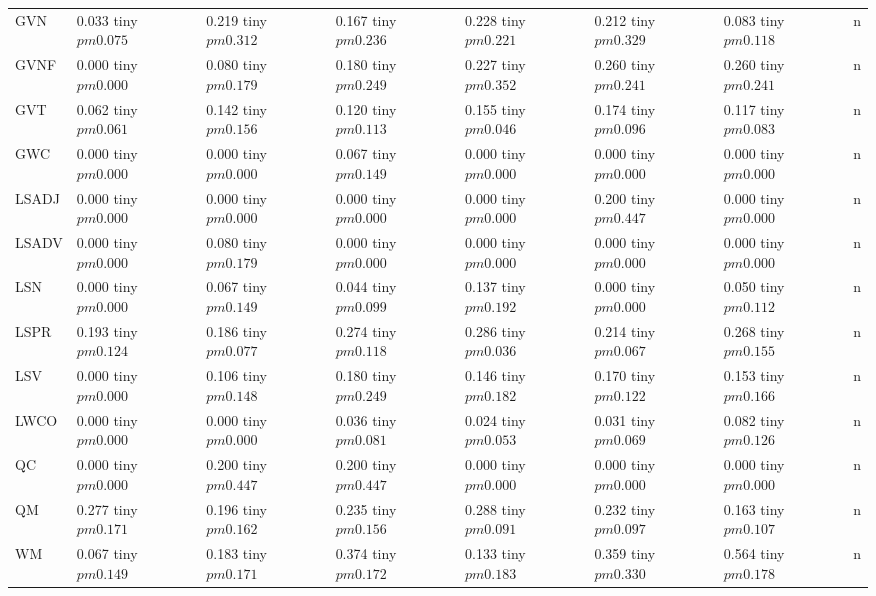 \begin{table}
\begin{tabular}{llllllll}
GVN & 0.033 tiny $ pm 0.075$ & 0.219 tiny $ pm 0.312$ & 0.167 tiny $ pm 0.236$ & 0.228 tiny $ pm 0.221$ & 0.212 tiny $ pm 0.329$ & 0.083 tiny $ pm 0.118$ & n \\
GVNF & 0.000 tiny $ pm 0.000$ & 0.080 tiny $ pm 0.179$ & 0.180 tiny $ pm 0.249$ & 0.227 tiny $ pm 0.352$ & 0.260 tiny $ pm 0.241$ & 0.260 tiny $ pm 0.241$ & n \\
GVT & 0.062 tiny $ pm 0.061$ & 0.142 tiny $ pm 0.156$ & 0.120 tiny $ pm 0.113$ & 0.155 tiny $ pm 0.046$ & 0.174 tiny $ pm 0.096$ & 0.117 tiny $ pm 0.083$ & n \\
GWC & 0.000 tiny $ pm 0.000$ & 0.000 tiny $ pm 0.000$ & 0.067 tiny $ pm 0.149$ & 0.000 tiny $ pm 0.000$ & 0.000 tiny $ pm 0.000$ & 0.000 tiny $ pm 0.000$ & n \\
LSADJ & 0.000 tiny $ pm 0.000$ & 0.000 tiny $ pm 0.000$ & 0.000 tiny $ pm 0.000$ & 0.000 tiny $ pm 0.000$ & 0.200 tiny $ pm 0.447$ & 0.000 tiny $ pm 0.000$ & n \\
LSADV & 0.000 tiny $ pm 0.000$ & 0.080 tiny $ pm 0.179$ & 0.000 tiny $ pm 0.000$ & 0.000 tiny $ pm 0.000$ & 0.000 tiny $ pm 0.000$ & 0.000 tiny $ pm 0.000$ & n \\
LSN & 0.000 tiny $ pm 0.000$ & 0.067 tiny $ pm 0.149$ & 0.044 tiny $ pm 0.099$ & 0.137 tiny $ pm 0.192$ & 0.000 tiny $ pm 0.000$ & 0.050 tiny $ pm 0.112$ & n \\
LSPR & 0.193 tiny $ pm 0.124$ & 0.186 tiny $ pm 0.077$ & 0.274 tiny $ pm 0.118$ & 0.286 tiny $ pm 0.036$ & 0.214 tiny $ pm 0.067$ & 0.268 tiny $ pm 0.155$ & n \\
LSV & 0.000 tiny $ pm 0.000$ & 0.106 tiny $ pm 0.148$ & 0.180 tiny $ pm 0.249$ & 0.146 tiny $ pm 0.182$ & 0.170 tiny $ pm 0.122$ & 0.153 tiny $ pm 0.166$ & n \\
LWCO & 0.000 tiny $ pm 0.000$ & 0.000 tiny $ pm 0.000$ & 0.036 tiny $ pm 0.081$ & 0.024 tiny $ pm 0.053$ & 0.031 tiny $ pm 0.069$ & 0.082 tiny $ pm 0.126$ & n \\
QC & 0.000 tiny $ pm 0.000$ & 0.200 tiny $ pm 0.447$ & 0.200 tiny $ pm 0.447$ & 0.000 tiny $ pm 0.000$ & 0.000 tiny $ pm 0.000$ & 0.000 tiny $ pm 0.000$ & n \\
QM & 0.277 tiny $ pm 0.171$ & 0.196 tiny $ pm 0.162$ & 0.235 tiny $ pm 0.156$ & 0.288 tiny $ pm 0.091$ & 0.232 tiny $ pm 0.097$ & 0.163 tiny $ pm 0.107$ & n \\
WM & 0.067 tiny $ pm 0.149$ & 0.183 tiny $ pm 0.171$ & 0.374 tiny $ pm 0.172$ & 0.133 tiny $ pm 0.183$ & 0.359 tiny $ pm 0.330$ & 0.564 tiny $ pm 0.178$ & n \\

\end{tabular}
\end{table}

